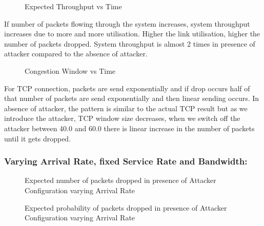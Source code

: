 \pagebreak

\begin{figure}[!htb]
	\centering
	\qquad
	\caption{{Expected Throughput vs Time}}
	\label{fig:figaf1}
\end{figure}

If number of packets flowing through the system increases, system throughput increases due to more and more utilisation. Higher the link utilisation, higher the number of packets dropped. System throughput is almost 2 times in presence of attacker compared to the absence of attacker.   


\begin{figure}[!htb]
	\centering
	\qquad
	\caption{{Congestion Window vs Time}}
	\label{fig:figaf1}
\end{figure}

For TCP connection, packets are send exponentially and if drop occurs half of that number of packets are send exponentially and then linear sending occurs. In absence of attacker, the pattern is similar to the actual TCP result but as we introduce the attacker, TCP window size decreases, when we switch off the attacker between 40.0 and 60.0 there is linear increase in the number of packets until it gets dropped.

\pagebreak

\subsubsection*{Varying Arrival Rate, fixed Service Rate and Bandwidth:}

\begin{figure}[H]
		\centering
		\caption{{Expected number of packets dropped in presence of Attacker Configuration varying Arrival Rate}}
		\label{fig:figba1}
\end{figure}

\begin{figure}[H]
		\centering
		\caption{{Expected probability of packets dropped in presence of Attacker Configuration varying Arrival Rate}}
		\label{fig:figbc1}
\end{figure}


